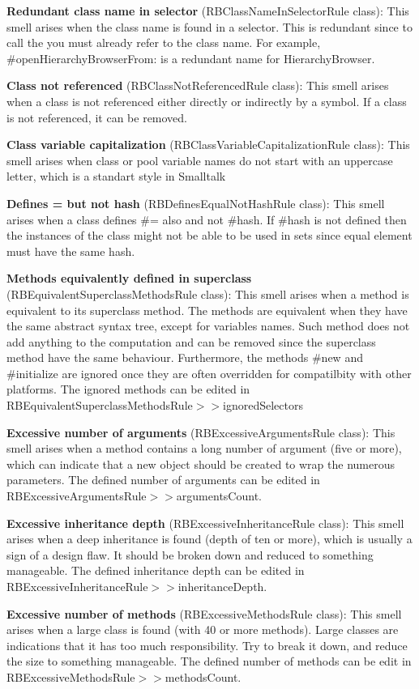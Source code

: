 \textbf{Redundant class name in selector} (RBClassNameInSelectorRule class): This smell arises when the class name is found in a selector. This is redundant since to call the you must already refer to the class name. For example, \#openHierarchyBrowserFrom: is a redundant name for HierarchyBrowser.

\textbf{Class not referenced} (RBClassNotReferencedRule class): This smell arises when a class is not referenced either directly or indirectly by a symbol. If a class is not referenced, it can be removed.

\textbf{Class variable capitalization} (RBClassVariableCapitalizationRule class): This smell arises when class or pool variable names do not start with an uppercase letter, which is a standart style in Smalltalk

\textbf{Defines = but not hash} (RBDefinesEqualNotHashRule class): This smell arises when a class defines \#= also and not \#hash. If \#hash is not defined then the instances of the class might not be able to be used in sets since equal element must have the same hash.

\textbf{Methods equivalently defined in superclass} (RBEquivalentSuperclassMethodsRule class): This smell arises when a method is equivalent to its superclass method. The methods are equivalent when they have the same abstract syntax tree, except for variables names. Such method does not add anything to the computation and can be removed since the superclass method have the same behaviour. Furthermore, the methods \#new and \#initialize are ignored once they are often overridden for compatilbity with other platforms. The ignored methods can be edited in RBEquivalentSuperclassMethodsRule$>>$ignoredSelectors

\textbf{Excessive number of arguments} (RBExcessiveArgumentsRule class): This smell arises when a method contains a long number of argument (five or more), which can indicate that a new object should be created to wrap the numerous parameters. The defined number of arguments can be edited in RBExcessiveArgumentsRule$>>$argumentsCount.

\textbf{Excessive inheritance depth} (RBExcessiveInheritanceRule class): This smell arises when a deep inheritance is found (depth of ten or more), which is usually a sign of a design flaw. It should be broken down and reduced to something manageable. The defined inheritance depth can be edited in RBExcessiveInheritanceRule$>>$inheritanceDepth.

\textbf{Excessive number of methods} (RBExcessiveMethodsRule class): This smell arises when a large class is found (with 40 or more methods). Large classes are indications that it has too much responsibility. Try to break it down, and reduce the size to something manageable. The defined number of methods can be edit in RBExcessiveMethodsRule$>>$methodsCount.

